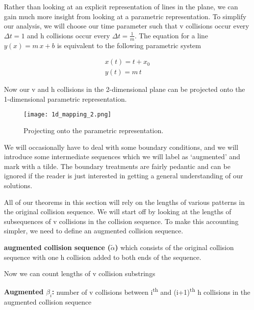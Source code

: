Rather than looking at an explicit representation of lines in the plane, we can gain much more insight from looking at a parametric representation. To simplify our analysis, we will choose our time parameter such that v collisions occur every $\Delta t = 1$ and h collisions occur every $\Delta t = \frac{1}{m}$. The equation for a line $y(x) = m \, x + b$ is equivalent to the following parametric system

\begin{align}\label{eq:parametric-line}
	x(t) = t + x_0\\
	y(t) = m \, t
\end{align}

Now our v and h collisions in the 2-dimensional plane can be projected onto the 1-dimensional parametric representation.

\begin{figure}[H]
  \begin{center}
    \texttt{[image: 1d\_mapping\_2.png]}
  \end{center}
  \vspace{-.2in} %
  \caption{\label{fig:1d-projection} Projecting onto the parametric representation.}
\end{figure}

We will occasionally have to deal with some boundary conditions, and we will introduce some intermediate sequences which we will label as `augmented' and mark with a tilde. The boundary treatments are fairly pedantic and can be ignored if the reader is just interested in getting a general understanding of our solutions.

All of our theorems in this section will rely on the lengths of various patterns in the original collision sequence. We will start off by looking at the lengths of subsequences of v collisions in the collision sequence. To make this accounting simpler, we need to define an augmented collision sequence.

\begin{definition}
	\textbf{augmented collision sequence ($\tilde{\alpha}$)} which consists of the original collision sequence with one h collision added to both ends of the sequence.
\end{definition}

Now we can count lengths of v collision substrings

\begin{definition}
	\textbf{Augmented $\beta_i$:} number of v collisions between i\textsuperscript{th} and (i+1)\textsuperscript{th} h collisions in the augmented collision sequence
\end{definition}

